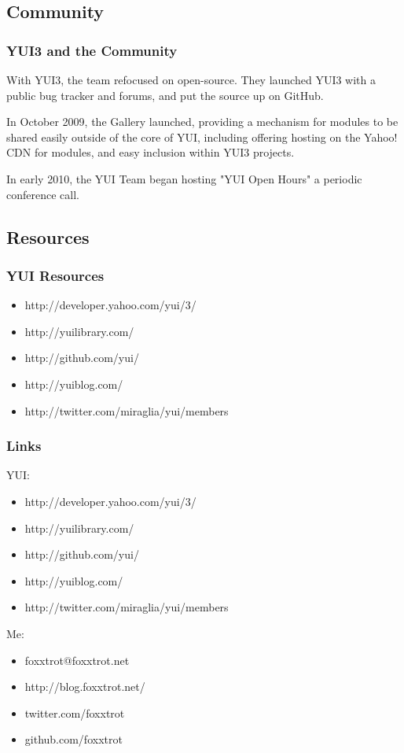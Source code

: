 \documentclass[t]{beamer}
\begin{document}
\subsection{Community}
\begin{frame}
 \frametitle{YUI3 and the Community}
 With YUI3, the team refocused on open-source. They launched YUI3 with a public bug tracker and forums, and put the source up on GitHub.

\bigskip
 In October 2009, the Gallery launched, providing a mechanism for modules to be shared easily outside of the core of YUI, including offering hosting on the Yahoo! CDN for modules, and easy inclusion within YUI3 projects.

\bigskip
 In early 2010, the YUI Team began hosting "YUI Open Hours" a periodic conference call.
\end{frame}

\subsection{Resources}
\begin{frame}
 \frametitle{YUI Resources}
 \begin{itemize}
  \item http://developer.yahoo.com/yui/3/
  \item http://yuilibrary.com/
  \item http://github.com/yui/
  \item http://yuiblog.com/
  \item http://twitter.com/miraglia/yui/members
 \end{itemize}
\end{frame}

\begin{frame}
 \frametitle{Links}
 YUI:
 \begin{itemize}
  \item http://developer.yahoo.com/yui/3/
  \item http://yuilibrary.com/
  \item http://github.com/yui/
  \item http://yuiblog.com/
  \item http://twitter.com/miraglia/yui/members
 \end{itemize}

 Me:
 \begin{itemize}
  \item foxxtrot@foxxtrot.net
  \item http://blog.foxxtrot.net/
  \item twitter.com/foxxtrot
  \item github.com/foxxtrot
 \end{itemize}
\end{frame}
\end{document}
